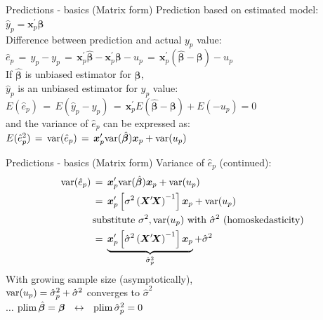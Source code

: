 \documentclass{beamer}
\begin{document}
\begin{frame}{Predictions - basics (Matrix form)}
Prediction based on estimated model:\\
\vspace{0.3cm}
$\hat{y}_p = \bm{x}_{p}^\prime \hat{\bm{\beta}}$\\
\vspace{0.3cm}
Difference between prediction and actual $y_p$ value:\\
\vspace{0.3cm}
$\hat{e}_p \,=\, \hat{y}_p - y_p
  \,=\, \bm{x}_{p}^\prime \hat{\bm{\beta}} - \bm{x}_{p}^\prime \bm{\beta} - u_p
  \,=\, \bm{x}_{p}^\prime (\hat{\bm{\beta}} - \bm{\beta}) - u_p$\\
\vspace{0.3cm}
If $\hat{\bm{\beta}}$ is unbiased estimator for $\bm{\beta}$, \\
$\hat{y}_p$ is an unbiased estimator for $y_p$ value:\\
\vspace{0.3cm}
$E(\hat{e}_p) \,=\, E(\hat{y}_p - y_p)
   \,=\, \bm{x}_{p}^\prime E(\hat{\bm{\beta}} - \bm{\beta}) + E(-u_p) =0$\\
\vspace{0.3cm}
and the variance of $\hat{e}_p$ can be expressed as:\\
\vspace{0.3cm}
$E(\hat{e}_p^2) \,=\,\textnormal{var}(\hat{e}_p)
   \,=\, \bm{x}_{p}^\prime \textnormal{var}(\hat{\bm{\beta}})\bm{x}_{p} + \textnormal{var}(u_p) $
\end{frame}


\begin{frame}{Predictions - basics (Matrix form)}
Variance of $\hat{e}_p$ (continued):
\begin{equation*}
\begin{aligned}
\textnormal{var}(\hat{e}_p) \,&=\,
  \bm{x}_{p}^\prime \textnormal{var}(\hat{\bm{\beta}})\bm{x}_{p} + \textnormal{var}(u_p)\\
 \,&=\,
   \bm{x}_{p}^\prime \left[ \sigma^2 \left( \bm{X}^\prime \! \bm{X}  \right)^{-1} \right] \bm{x}_{p} + \textnormal{var}(u_p)\\
   & \textnormal{substitute $\sigma^2, \textnormal{var}(u_p)$ with $\hat{\sigma}^2$ (homoskedasticity)}\\
  \,&=\,
   \underbrace{\bm{x}_{p}^\prime \left[ \hat{\sigma}^2 \left( \bm{X}^\prime \! \bm{X}  \right)^{-1} \right] \bm{x}_{p}}_{\hat{\sigma}_p^2}
   + \hat{\sigma}^2
\end{aligned}
\end{equation*}
With growing sample size (asymptotically), \\
$\textnormal{var}(u_p) = \hat{\sigma}_p^2 + \hat{\sigma}^2$ converges to $\hat{\sigma}^2$\\
$\dots$ $\textnormal{plim} \, \hat{\bm{\beta}} = \bm{\beta} \,\,\,\, \leftrightarrow \,\,\,\, 
  \textnormal{plim} \, \hat{\sigma}_p^2 = 0$

\end{frame}
\end{document}
